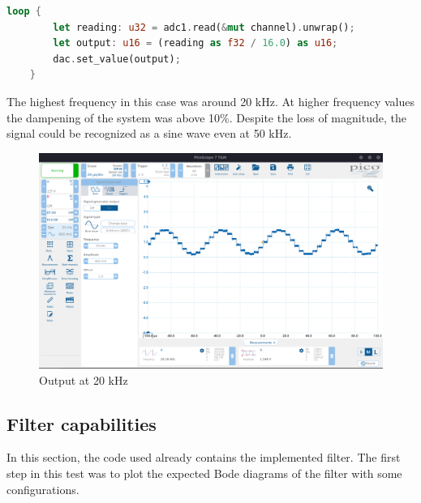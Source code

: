 \begin{lstlisting}[language=Rust,frame=single,float=!ht,style=customrust,label={lst:adc-dac-test},caption={Code for Testing ADC and DAC Together}]
    loop {
        let reading: u32 = adc1.read(&mut channel).unwrap();
        let output: u16 = (reading as f32 / 16.0) as u16;
        dac.set_value(output);
    }
\end{lstlisting}

The highest frequency in this case was around 20 kHz. At higher frequency values the dampening of the system was above 10\%. Despite the loss of magnitude, the signal could be recognized as a sine wave even at 50 kHz.

\begin{figure}[H]
    \centering
    \includegraphics[width=150mm, keepaspectratio]{figures/sine20khz.png}
    \caption{Output at 20 kHz}
    \label{fig:sine20khz}
\end{figure}

\subsection{Filter capabilities}

In this section, the code used already contains the implemented filter. The first step in this test was to plot the expected Bode diagrams of the filter with some configurations.

